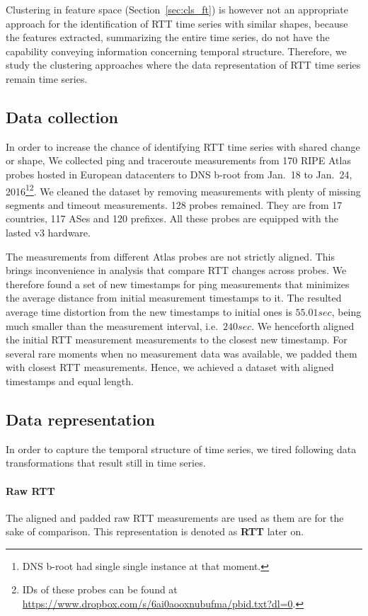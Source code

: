 Clustering in feature space (Section~\ref{sec:cls_ft}) is however not an appropriate approach for the identification of RTT time series with similar shapes, because the features extracted, summarizing the entire time series, do not have the capability conveying information concerning temporal structure.
Therefore, we study the clustering approaches where the data representation of RTT time series remain time series.

\subsection{Data collection}
In order to increase the chance of identifying RTT time series with shared change or shape, We collected ping and traceroute measurements from 170 RIPE Atlas probes hosted in European datacenters to DNS b-root from Jan.\ 18 to Jan.\ 24, 2016\footnote{DNS b-root had single single instance at that moment.}\footnote{IDs of these probes can be found at \url{https://www.dropbox.com/s/6ai0aooxnubufma/pbid.txt?dl=0}.}.
We cleaned the dataset by removing measurements with plenty of missing segments and timeout measurements.
128 probes remained. They are from 17 countries, 117 ASes and 120 prefixes. All these probes are equipped with the lasted v3 hardware.

The measurements from different Atlas probes are not strictly aligned.
This brings inconvenience in analysis that compare RTT changes across probes. 
We therefore found a set of new timestamps for ping measurements that minimizes the average distance from initial measurement timestamps to it.
The resulted average time distortion from the new timestamps to initial ones is $55.01 sec$, being much smaller than the measurement interval, i.e.\ $240s ec$.
We henceforth aligned the initial RTT measurement measurements to the closest new timestamp.
For several rare moments when no measurement data was available, we padded them with closest RTT measurements.
Hence, we achieved a dataset with aligned timestamps and equal length.

\subsection{Data representation}
In order to capture the temporal structure of time series, we tired following data transformations that result still in time series.

\paragraph*{Raw RTT}  The aligned and padded raw RTT measurements are used as them are for the sake of comparison. This representation is denoted as \textbf{RTT} later on.

